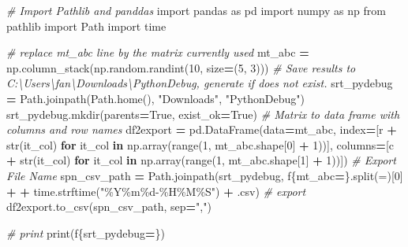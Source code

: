 \documentclass[
]{book}
\newenvironment{Shaded}{\begin{snugshade}}{\end{snugshade}}
\newcommand{\BuiltInTok}[1]{#1}
\newcommand{\CommentTok}[1]{\textcolor[rgb]{0.56,0.35,0.01}{\textit{#1}}}
\newcommand{\ControlFlowTok}[1]{\textcolor[rgb]{0.13,0.29,0.53}{\textbf{#1}}}
\newcommand{\DecValTok}[1]{\textcolor[rgb]{0.00,0.00,0.81}{#1}}
\newcommand{\ImportTok}[1]{#1}
\newcommand{\KeywordTok}[1]{\textcolor[rgb]{0.13,0.29,0.53}{\textbf{#1}}}
\newcommand{\NormalTok}[1]{#1}
\newcommand{\OperatorTok}[1]{\textcolor[rgb]{0.81,0.36,0.00}{\textbf{#1}}}
\newcommand{\SpecialCharTok}[1]{\textcolor[rgb]{0.00,0.00,0.00}{#1}}
\newcommand{\SpecialStringTok}[1]{\textcolor[rgb]{0.31,0.60,0.02}{#1}}
\newcommand{\StringTok}[1]{\textcolor[rgb]{0.31,0.60,0.02}{#1}}
\newcommand{\VariableTok}[1]{\textcolor[rgb]{0.00,0.00,0.00}{#1}}
\begin{document}
\begin{Shaded}
\begin{Highlighting}[]
\CommentTok{\# Import Pathlib and panddas}
\ImportTok{import}\NormalTok{ pandas }\ImportTok{as}\NormalTok{ pd}
\ImportTok{import}\NormalTok{ numpy }\ImportTok{as}\NormalTok{ np}
\ImportTok{from}\NormalTok{ pathlib }\ImportTok{import}\NormalTok{ Path}
\ImportTok{import}\NormalTok{ time}

\CommentTok{\# replace mt\_abc line by the matrix currently used}
\NormalTok{mt\_abc }\OperatorTok{=}\NormalTok{ np.column\_stack(np.random.randint(}\DecValTok{10}\NormalTok{, size}\OperatorTok{=}\NormalTok{(}\DecValTok{5}\NormalTok{, }\DecValTok{3}\NormalTok{)))}
\CommentTok{\# Save results to C:\textbackslash{}Users\textbackslash{}fan\textbackslash{}Downloads\textbackslash{}PythonDebug, generate if does not exist.}
\NormalTok{srt\_pydebug }\OperatorTok{=}\NormalTok{ Path.joinpath(Path.home(), }\StringTok{"Downloads"}\NormalTok{, }\StringTok{"PythonDebug"}\NormalTok{)}
\NormalTok{srt\_pydebug.mkdir(parents}\OperatorTok{=}\VariableTok{True}\NormalTok{, exist\_ok}\OperatorTok{=}\VariableTok{True}\NormalTok{)}
\CommentTok{\# Matrix to data frame with columns and row names}
\NormalTok{df2export }\OperatorTok{=}\NormalTok{ pd.DataFrame(data}\OperatorTok{=}\NormalTok{mt\_abc,}
\NormalTok{                         index}\OperatorTok{=}\NormalTok{[}\StringTok{\textquotesingle{}r\textquotesingle{}} \OperatorTok{+} \BuiltInTok{str}\NormalTok{(it\_col) }\ControlFlowTok{for}\NormalTok{ it\_col }\KeywordTok{in}\NormalTok{ np.array(}\BuiltInTok{range}\NormalTok{(}\DecValTok{1}\NormalTok{, mt\_abc.shape[}\DecValTok{0}\NormalTok{] }\OperatorTok{+} \DecValTok{1}\NormalTok{))],}
\NormalTok{                         columns}\OperatorTok{=}\NormalTok{[}\StringTok{\textquotesingle{}c\textquotesingle{}} \OperatorTok{+} \BuiltInTok{str}\NormalTok{(it\_col) }\ControlFlowTok{for}\NormalTok{ it\_col }\KeywordTok{in}\NormalTok{ np.array(}\BuiltInTok{range}\NormalTok{(}\DecValTok{1}\NormalTok{, mt\_abc.shape[}\DecValTok{1}\NormalTok{] }\OperatorTok{+} \DecValTok{1}\NormalTok{))])}
\CommentTok{\# Export File Name}
\NormalTok{spn\_csv\_path }\OperatorTok{=}\NormalTok{ Path.joinpath(srt\_pydebug, }\SpecialStringTok{f\textquotesingle{}}\SpecialCharTok{\{}\NormalTok{mt\_abc}\OperatorTok{=}\SpecialCharTok{\}}\SpecialStringTok{\textquotesingle{}}\NormalTok{.split(}\StringTok{\textquotesingle{}=\textquotesingle{}}\NormalTok{)[}\DecValTok{0}\NormalTok{] }\OperatorTok{+} \StringTok{\textquotesingle{}{-}\textquotesingle{}} \OperatorTok{+}\NormalTok{ time.strftime(}\StringTok{"\%Y\%m}\SpecialCharTok{\%d}\StringTok{{-}\%H\%M\%S"}\NormalTok{) }\OperatorTok{+} \StringTok{\textquotesingle{}.csv\textquotesingle{}}\NormalTok{)}
\CommentTok{\# export}
\NormalTok{df2export.to\_csv(spn\_csv\_path, sep}\OperatorTok{=}\StringTok{","}\NormalTok{)}

\CommentTok{\# print}
\BuiltInTok{print}\NormalTok{(}\SpecialStringTok{f\textquotesingle{}}\SpecialCharTok{\{}\NormalTok{srt\_pydebug}\OperatorTok{=}\SpecialCharTok{\}}\SpecialStringTok{\textquotesingle{}}\NormalTok{)}
\end{Highlighting}
\end{Shaded}
\end{document}
